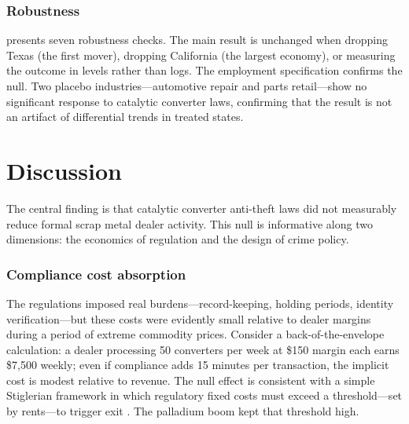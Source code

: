 \documentclass[12pt]{article}
\begin{document}
\subsubsection*{Robustness}  presents seven robustness checks. The main result is unchanged when dropping Texas (the first mover), dropping California (the largest economy), or measuring the outcome in levels rather than logs. The employment specification confirms the null. Two placebo industries---automotive repair and parts retail---show no significant response to catalytic converter laws, confirming that the result is not an artifact of differential trends in treated states.


\section{Discussion}\label{sec:discussion}

\label{apep_main_text_end}

The central finding is that catalytic converter anti-theft laws did not measurably reduce formal scrap metal dealer activity. This null is informative along two dimensions: the economics of regulation and the design of crime policy.

\subsubsection*{Compliance cost absorption} The regulations imposed real burdens---record-keeping, holding periods, identity verification---but these costs were evidently small relative to dealer margins during a period of extreme commodity prices. Consider a back-of-the-envelope calculation: a dealer processing 50 converters per week at \$150 margin each earns \$7,500 weekly; even if compliance adds 15 minutes per transaction, the implicit cost is modest relative to revenue. The null effect is consistent with a simple Stiglerian framework in which regulatory fixed costs must exceed a threshold---set by rents---to trigger exit \citep{stigler1971, becker1968}. The palladium boom kept that threshold high.
\end{document}
